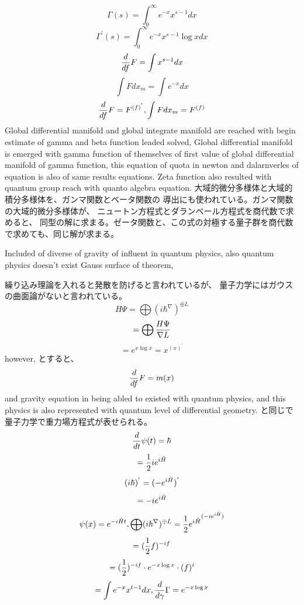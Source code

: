 \documentclass{jsarticle}
\begin{document}
{    $$ \Gamma(s) = \int^{\infty}_{0} e^{-x}x^{s - 1}dx $$
    $$  \Gamma^{'}(s) = \int^{\infty}_{0} e^{-x}x^{s - 1} \log x dx $$
    $$ {d \over df}F = \int x^{s - 1}dx $$
    $$ \int F dx_m = \int e^{-x}dx $$
    $$ {d \over df}F = F^{(f)^{'}}, \int F dx_m = F^{(f)} $$
    Global differential manifold and global integrate manifold are
    reached with begin estimate of gamma and beta function leaded solved,
    Global differential manifold is emerged with gamma function of
    themselves of first value of global differential manifold of gamma
    function, this equation of quota in newton and dalarnverles of equation
    is also of same results equations. Zeta function also resulted with
    quantum group reach with quanto algebra equation.
    大域的微分多様体と大域的積分多様体を、ガンマ関数とベータ関数の
    導出にも使われている。ガンマ関数の大域的微分多様体が、
    ニュートン方程式とダランベール方程式を商代数で求めると、
    同型の解に求まる。ゼータ関数と、この式の対極する量子群を商代数
    で求めても、同じ解が求まる。

    Included of diverse of gravity of influent in quantum physics,
    also quantum physics doesn't exist Gauss surface of theorem,
   
    繰り込み理論を入れると発散を防げると言われているが、
    量子力学にはガウスの曲面論がないと言われている。
    $$ H \Psi = \bigoplus (i \hbar ^{\nabla})^{\oplus L} $$
    $$ = \bigoplus {{ H \Psi} \over \nabla L} $$
    $$ = e^{x \log x} = x^{(x)^{'}} $$
    however,
    とすると、
    $$ {d \over df}F = m(x) $$
    and gravity equation in being abled to existed with quantum physics,
    and this physics is also represented with quantum level of differential
    geometry.
    と同じで量子力学で重力場方程式が表せられる。
    $$ {d \over dt}\psi(t) = \hbar $$
    $$ = {1 \over 2}i e^{i \Hat{H}} $$
    $$ (i \hbar)^{'} = (- e^{i \Hat{H}})^{'} $$
    $$ = - i e^{i \Hat{H}} $$
    $$ \psi(x) = e^{-i \Hat{H}t}, \bigoplus (i \hbar ^{\nabla})^{\oplus L} 
    = {{{1 \over 2} e^{i \Hat{H}}}^{(-i e^{i \Hat{H}})}} $$
    $$ = ({1 \over 2}f)^{-i f}$$
    $$ = ({1 \over 2})^{-i f} \cdot e^{-x \log x} \cdot (f)^{i} $$
    $$ = \int e^{- x} x^{t - 1}dx, {d \over d \gamma}\Gamma = e^{-x \log x}  $$
     
}
\end{document}
